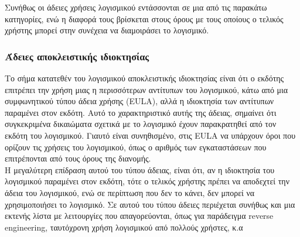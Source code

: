 Συνήθως οι άδειες χρήσεις λογισμικού εντάσσονται σε μια από τις παρακάτω κατηγορίες, ενώ η διαφορά τους βρίσκεται στους όρους με τους οποίους ο τελικός χρήστης μπορεί στην συνέχεια να διαμοιράσει το λογισμικό.
\subsubsection{Άδειες αποκλειστικής ιδιοκτησίας}
Το σήμα κατατεθέν του λογισμικού αποκλειστικής ιδιοκτησίας είναι ότι ο εκδότης επιτρέπει την χρήση μιας η περισσότερων αντίτυπων του λογισμικού, κάτω από μια συμφωνητικού τύπου άδεια χρήσης (EULA), αλλά η ιδιοκτησία των αντίτυπων παραμένει στον εκδότη. Αυτό το χαρακτηριστικό αυτής της άδειας, σημαίνει ότι συγκεκριμένα δικαιώματα σχετικά με το λογισμικό έχουν παρακρατηθεί από τον εκδότη του λογισμικού. Γιαυτό είναι συνηθισμένο, στις EULA να υπάρχουν όροι που ορίζουν τις χρήσεις του λογισμικού, όπως ο αριθμός των εγκαταστάσεων που επιτρέπονται από τους όρους της διανομής.\\
Η μεγαλύτερη επίδραση αυτού του τύπου άδειας, είναι ότι, αν η ιδιοκτησία του λογισμικού παραμένει στον εκδότη, τότε ο τελικός χρήστης πρέπει να αποδεχτεί την άδεια του λογισμικού, ενώ σε περίπτωση που δεν το κάνει, δεν μπορεί να χρησιμοποιήσει το λογισμικό. Σε αυτού του τύπου άδειες περιέχεται συνήθως και μια εκτενής λίστα με λειτουργίες που απαγορεύονται, όπως για παράδειγμα reverse engineering, ταυτόχρονη χρήση λογισμικού από πολλούς χρήστες, κ.α
